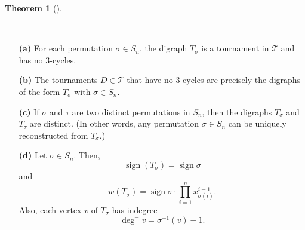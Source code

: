 \documentclass[numbers=enddot,12pt,final,onecolumn,notitlepage]{scrartcl}%
\numberwithin{exer}{subsection}
\theoremstyle{definition}
\newtheorem{theo}{Theorem}[subsection]
\newenvironment{theorem}[1][]
{\begin{theo}[#1]\begin{leftbar}}
{\end{leftbar}\end{theo}}
\let\prodnonlimits\prod
\renewcommand{\prod}{\prodnonlimits\limits}
\begin{document}
\begin{theorem}
\label{thm.Tsig.props}\ \ 

\begin{enumerate}
\item[\textbf{(a)}] For each permutation $\sigma\in S_{n}$, the digraph
$T_{\sigma}$ is a tournament in $\mathcal{T}$ and has no $3$-cycles.

\item[\textbf{(b)}] The tournaments $D\in\mathcal{T}$ that have no $3$-cycles
are precisely the digraphs of the form $T_{\sigma}$ with $\sigma\in S_{n}$.

\item[\textbf{(c)}] If $\sigma$ and $\tau$ are two distinct permutations in
$S_{n}$, then the digraphs $T_{\sigma}$ and $T_{\tau}$ are distinct. (In other
words, any permutation $\sigma\in S_{n}$ can be uniquely reconstructed from
$T_{\sigma}$.)

\item[\textbf{(d)}] Let $\sigma\in S_{n}$. Then,%
\begin{equation}
\operatorname*{sign}\left(  T_{\sigma}\right)  =\operatorname*{sign}%
\sigma\label{eq.thm.Tsig.props.d.sign}%
\end{equation}
and%
\begin{equation}
w\left(  T_{\sigma}\right)  =\operatorname*{sign}\sigma\cdot\prod_{i=1}%
^{n}x_{\sigma\left(  i\right)  }^{i-1}. \label{eq.thm.Tsig.props.d.w}%
\end{equation}
Also, each vertex $v$ of $T_{\sigma}$ has indegree%
\begin{equation}
\deg^{-}v=\sigma^{-1}\left(  v\right)  -1. \label{eq.thm.Tsig.props.d.deg-}%
\end{equation}

\end{enumerate}
\end{theorem}
\end{document}
